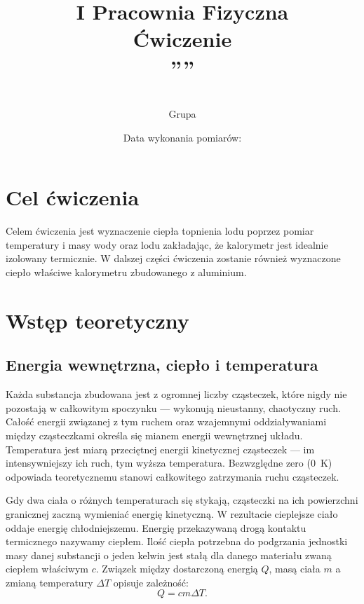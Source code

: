 \documentclass[12pt, a4paper]{article}
\title{
    \large I Pracownia Fizyczna \\[0.5em]
    \textbf{Ćwiczenie \nrCwiczenia} \\[0.3em]
    \LARGE \tytul\space''\codeword''
}
\author{
    \autor\\
     Grupa \nrGrupy}
\date{
    Data wykonania pomiarów: \dataWykonania\\
}
\begin{document}

\maketitle
\thispagestyle{empty}
\newpage

\section{Cel ćwiczenia}
Celem ćwiczenia jest wyznaczenie ciepła topnienia lodu poprzez pomiar
temperatury i masy wody oraz lodu zakładając, że kalorymetr jest idealnie
izolowany termicznie. W dalszej części ćwiczenia zostanie również wyznaczone
ciepło właściwe kalorymetru zbudowanego z aluminium.

\section{Wstęp teoretyczny}

\subsection{Energia wewnętrzna, ciepło i temperatura}
Każda substancja zbudowana jest z ogromnej liczby cząsteczek, które nigdy nie
pozostają w całkowitym spoczynku --- wykonują nieustanny, chaotyczny ruch. Całość
energii związanej z tym ruchem oraz wzajemnymi oddziaływaniami między
cząsteczkami określa się mianem energii wewnętrznej układu. Temperatura jest
miarą przeciętnej energii kinetycznej cząsteczek --- im intensywniejszy ich ruch,
tym wyższa temperatura. Bezwzględne zero (\qty{0}{\kelvin}) odpowiada
teoretycznemu stanowi całkowitego zatrzymania ruchu cząsteczek.

Gdy dwa ciała o różnych temperaturach się stykają, cząsteczki na
ich powierzchni granicznej zaczną wymieniać energię kinetyczną. W rezultacie
cieplejsze ciało oddaje energię chłodniejszemu. Energię
przekazywaną drogą kontaktu termicznego nazywamy ciepłem. Ilość ciepła
potrzebna do podgrzania jednostki masy danej substancji o jeden kelwin jest stałą dla danego materiału
zwaną ciepłem właściwym $c$. Związek między dostarczoną
energią $Q$, masą ciała $m$ a zmianą temperatury $\Delta T$ opisuje zależność:
\begin{equation}
    Q = cm\Delta T.
\end{equation}
\end{document}
